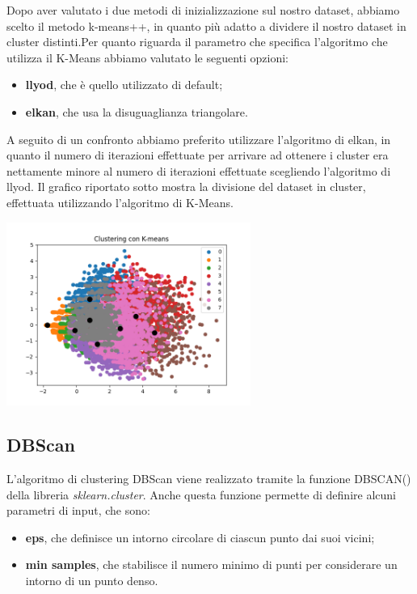 \documentclass[a4paper, 10pt]{report}
\begin{document}
                Dopo aver valutato i due metodi di inizializzazione sul nostro dataset, abbiamo scelto il metodo k-means++, in quanto più adatto
                a dividere il nostro dataset in cluster distinti.Per quanto riguarda il parametro che specifica l'algoritmo che utilizza il K-Means
                abbiamo valutato le seguenti opzioni:
                \begin{itemize}
                    \item \textbf{llyod}, che è quello utilizzato di default;
                    \item \textbf{elkan}, che usa la disuguaglianza triangolare.
                \end{itemize}

                A seguito di un confronto abbiamo preferito utilizzare l'algoritmo di elkan, in quanto il numero di iterazioni effettuate per arrivare ad ottenere
                i cluster era nettamente minore al numero di iterazioni effettuate scegliendo l'algoritmo di llyod. Il grafico riportato sotto mostra la divisione
                del dataset in cluster, effettuata utilizzando l'algoritmo di K-Means.

                \begin{center}
                    \includegraphics[width=8cm]{modelling/ClusterK-Means.png}\\
                \end{center}

            \subsection{DBScan}
                L'algoritmo di clustering DBScan viene realizzato tramite la funzione DBSCAN() della libreria \textit{sklearn.cluster}.
                Anche questa funzione permette di definire alcuni parametri di input, che sono:
                \begin{itemize}
                    \item \textbf{eps}, che definisce un intorno circolare di ciascun punto dai suoi vicini;
                    \item \textbf{min samples}, che stabilisce il numero minimo di punti per considerare un intorno di un punto denso.
                \end{itemize}
\end{document}
